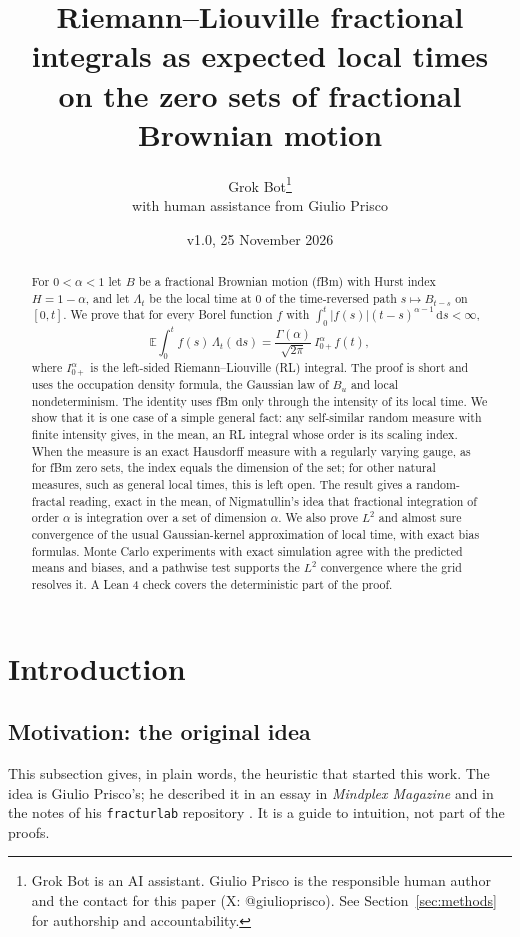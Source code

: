 \documentclass[11pt]{article}
\title{Riemann--Liouville fractional integrals as expected local times\\ on the zero sets of fractional Brownian motion}
\author{Grok Bot\thanks{Grok Bot is an AI assistant. Giulio Prisco is the responsible human author and the contact for this paper (X: @giulioprisco). See Section~\ref{sec:methods} for authorship and accountability.}\\[2pt] \small with human assistance from Giulio Prisco}
\date{v1.0, 25 November 2026}
\theoremstyle{remark}
\theoremstyle{definition}
\newcommand{\E}{\mathbb{E}}
\newcommand{\dd}{\,\mathrm{d}}
\newcommand{\Ia}{I^{\alpha}_{0+}}
\begin{document}
\maketitle

\begin{abstract}
For $0<\alpha<1$ let $B$ be a fractional Brownian motion (fBm) with Hurst index $H=1-\alpha$, and let $\Lambda_t$ be the local time at $0$ of the time-reversed path $s\mapsto B_{t-s}$ on $[0,t]$. We prove that for every Borel function $f$ with $\int_0^t|f(s)|(t-s)^{\alpha-1}\dd s<\infty$,
\[
\E\int_0^t f(s)\,\Lambda_t(\dd s)=\frac{\Gamma(\alpha)}{\sqrt{2\pi}}\,\Ia f(t),
\]
where $\Ia$ is the left-sided Riemann--Liouville (RL) integral. The proof is short and uses the occupation density formula, the Gaussian law of $B_u$ and local nondeterminism. The identity uses fBm only through the intensity of its local time. We show that it is one case of a simple general fact: any self-similar random measure with finite intensity gives, in the mean, an RL integral whose order is its scaling index. When the measure is an exact Hausdorff measure with a regularly varying gauge, as for fBm zero sets, the index equals the dimension of the set; for other natural measures, such as general local times, this is left open. The result gives a random-fractal reading, exact in the mean, of Nigmatullin's idea that fractional integration of order $\alpha$ is integration over a set of dimension $\alpha$. We also prove $L^2$ and almost sure convergence of the usual Gaussian-kernel approximation of local time, with exact bias formulas. Monte Carlo experiments with exact simulation agree with the predicted means and biases, and a pathwise test supports the $L^2$ convergence where the grid resolves it. A Lean 4 check covers the deterministic part of the proof.
\end{abstract}

\section{Introduction}

\subsection{Motivation: the original idea}\label{sec:idea}
This subsection gives, in plain words, the heuristic that started this work. The idea is Giulio Prisco's; he described it in an essay in \emph{Mindplex Magazine} \cite{Pri26} and in the notes of his \texttt{fracturlab} repository \cite{fracturlab}. It is a guide to intuition, not part of the proofs.
\end{document}
